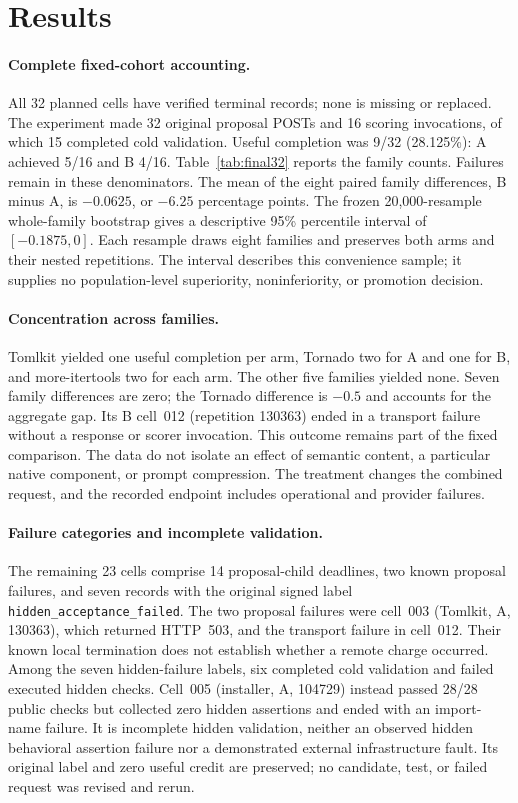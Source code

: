 \section{Results}
\label{sec:results}

\paragraph{Complete fixed-cohort accounting.}
All 32 planned cells have verified terminal records; none is missing or replaced.
The experiment made 32 original proposal POSTs and 16 scoring invocations,
of which 15 completed cold validation. Useful completion was 9/32 (28.125\%):
A achieved 5/16 and B 4/16. Table~\ref{tab:final32} reports the family counts.
Failures remain in these denominators. The mean of the eight paired family
differences, B minus A, is $-0.0625$, or $-6.25$ percentage points. The frozen
20,000-resample whole-family bootstrap gives a descriptive 95\% percentile
interval of $[-0.1875,0]$. Each resample draws eight families and preserves both
arms and their nested repetitions. The interval describes this convenience
sample; it supplies no population-level superiority, noninferiority, or
promotion decision.

\paragraph{Concentration across families.}
Tomlkit yielded one useful completion per arm, Tornado two for A and one for B,
and more-itertools two for each arm. The other five families yielded none.
Seven family differences are zero; the Tornado difference is $-0.5$ and
accounts for the aggregate gap. Its B cell~012 (repetition 130363) ended in a
transport failure without a response or scorer invocation. This outcome remains
part of the fixed comparison. The data do not isolate an effect of semantic
content, a particular native component, or prompt compression. The treatment
changes the combined request, and the recorded endpoint includes operational
and provider failures.

\paragraph{Failure categories and incomplete validation.}
The remaining 23 cells comprise 14 proposal-child deadlines, two known proposal
failures, and seven records with the original signed label
\texttt{hidden\_acceptance\_failed}. The two proposal failures were cell~003
(Tomlkit, A, 130363), which returned HTTP~503, and the transport failure in
cell~012. Their known local termination does not establish whether a remote
charge occurred. Among the seven hidden-failure labels, six completed cold
validation and failed executed hidden checks. Cell~005 (installer, A, 104729)
instead passed 28/28 public checks but collected zero hidden assertions and
ended with an import-name failure. It is incomplete hidden validation, neither
an observed hidden behavioral assertion failure nor a demonstrated external
infrastructure fault. Its original label and zero useful credit are preserved;
no candidate, test, or failed request was revised and rerun.

